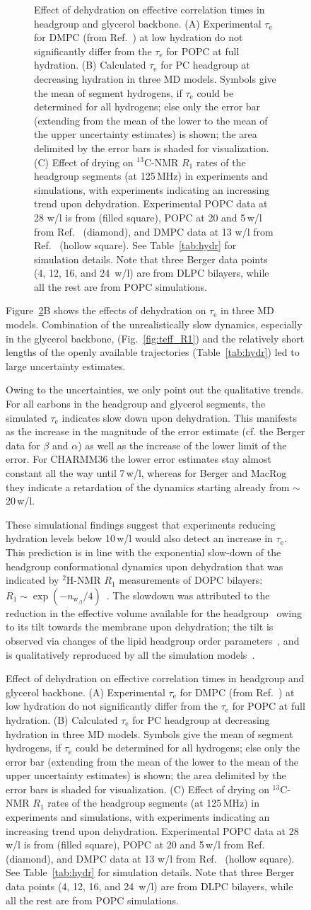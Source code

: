 \documentclass[journal=jcisd8,manuscript=article,layout=twocolumn]{achemso}
\begin{document}
\begin{figure}[h!]
\begin{figure}[ht!]
\caption{Effect of dehydration on %
effective correlation times %
in headgroup and glyc\-er\-ol backbone.
(A) Experimental $\tau_\mathrm e$ for
DMPC (from Ref.~) at low hydration %
do not significantly differ from the
$\tau_\mathrm e$ for POPC at full hydration. %
(B) Calculated $\tau_\mathrm e$  for
PC headgroup at decreasing hydration in three MD models. Symbols give the mean of segment hydrogens,
if $\tau_\mathrm{e}$ could be determined for all hydrogens; else only the error bar
(extending from the mean of the lower to the mean of the upper uncertainty estimates) is shown;
the area delimited by the error bars is shaded for visualization. (C) Effect of drying on $^{13}$C-NMR $R_1$ rates of the headgroup segments (at 125\,MHz)
in experiments and simulations, with experiments indicating an increasing trend upon dehydration. Experimental POPC data at 28 w/l is from \cite{reftoarchive} (filled square), POPC at 20 and 5\,w/l from Ref.~ (diamond), and DMPC data at 13 w/l from Ref.~ (hollow square). 
See Table~\ref{tab:hydr} for simulation details. Note that three Berger data points (4, 12, 16, and 24~w/l) are from DLPC bilayers, while all the rest are from POPC simulations.}
\label{fig:hydration}
\end{figure}

Figure~\ref{fig:hydration}B shows the effects of dehydration on $\tau_\mathrm e$ in three MD models.
Combination of
the unrealistically slow dynamics, especially in the glycerol backbone, (Fig.~\ref{fig:teff_R1}) and
the relatively short lengths of the openly available trajectories %
(Table~\ref{tab:hydr})
led to large uncertainty estimates. %
%

Owing to the uncertainties, we only point out the qualitative trends. For all carbons in the headgroup and glycerol segments, the simulated  $\tau_\mathrm e$ indicates slow down upon dehydration. This manifests as the increase in the magnitude of the error estimate (cf. the Berger data for $\beta$ and $\alpha$) as well as the increase of the lower limit of the error. 
For CHARMM36 the lower error estimates stay almost constant all the way until 7\,w/l, whereas for Berger and MacRog they indicate a retardation of the dynamics starting already from $\sim$20\,w/l.

These simulational findings suggest that
experiments reducing hydration levels below 10\,w/l would also detect an increase in $\tau_\mathrm e$.
This prediction is in line with the
exponential slow-down
of the headgroup conformational dynamics
upon dehydration that was indicated by $^2$H-NMR $R_{1}$ measurements
of DOPC bilayers:
$R_1\sim\exp(-n_{{\mathrm w\!}_{/\mathrm l}}/4)$~\cite{ulrich94}.
%
The slowdown was attributed to the reduction in the effective volume available for the headgroup~\cite{ulrich94}
owing to its tilt towards the membrane upon dehydration;
the tilt is observed via changes of the lipid headgroup order parameters~\cite{bechinger91},
and is qualitatively reproduced by all the simulation models~\cite{botan15}.


\end{figure}
\end{document}
